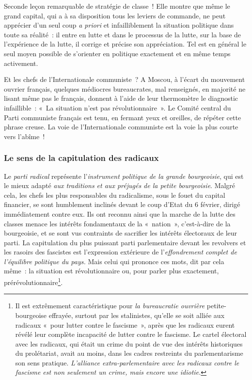 \documentclass[french,twoside]{book} %
\begin{document}
Seconde leçon remarquable de stratégie de classe ! Elle montre que même le grand capital, qui a à sa disposition tous les leviers de commande, ne peut apprécier d’un seul coup \emph{a priori} et infailliblement la situation politique dans toute sa réalité : il entre en lutte et dans le processus de la lutte, sur la base de l’expérience de la lutte, il corrige et précise son appréciation. Tel est en général le seul moyen possible de s’orienter en politique exactement et en même temps activement.\par
Et les chefs de l’Internationale communiste ? A Moscou, à l’écart du mouvement ouvrier français, quelques médiocres bureaucrates, mal renseignés, en majorité ne  lisant même pas le français, donnent à l’aide de leur thermomètre le diagnostic infaillible : « La situation n’est pas révolutionnaire ». Le Comité central du Parti communiste français est tenu, en fermant yeux et oreilles, de répéter cette phrase creuse. La voie de l’Internationale communiste est la voie la plus courte vers l’abîme !
\subsubsection[{Le sens de la capitulation des radicaux}]{Le sens de la capitulation des radicaux}
\noindent Le \emph{parti radical} représente l’\emph{instrument politique de la grande bourgeoisie}, qui est le mieux adapté \emph{aux traditions et aux préjugés de la petite bourgeoisie}. Malgré cela, les chefs les plus responsables du radicalisme, sous le fouet du capital financier, se sont humblement inclinés devant le coup d’Etat du 6 février, dirigé immédiatement contre eux. Ils ont reconnu ainsi que la marche de la lutte des classes menace les intérêts fondamentaux de la « nation », c’est-à-dire de la bourgeoisie, et se sont vus contraints de sacrifier les intérêts électoraux de leur parti. La capitulation du plus puissant parti parlementaire devant les revolvers et les rasoirs des fascistes est l’expression extérieure de l’\emph{effondrement complet de l’équilibre politique du pays. }Mais celui qui prononce ces mots, dit par cela même : la situation est révolutionnaire ou, pour parler plus exactement, prérévolutionnaire\footnote{ \noindent Il est extrêmement caractéristique pour \emph{la bureaucratie ouvrière} petite-bourgeoise effrayée, surtout par les stalinistes, qu’elle se soit alliée aux radicaux « pour lutter contre le fascisme », après que les radicaux eurent révélé leur complète incapacité de lutter contre le fascisme. Le cartel électoral avec les radicaux, qui était un crime du point de vue des intérêts historiques du prolétariat, avait au moins, dans les cadres restreints du parlementarisme son sens pratique. \emph{L’alliance extra-parlementaire avec les radicaux contre le fascisme est non seulement un crime, mais encore une idiotie.}
 }.
\end{document}
